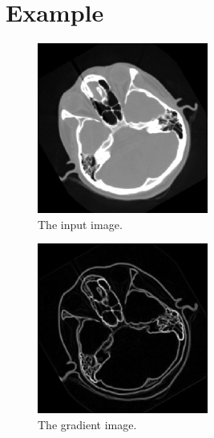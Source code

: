 \documentclass[IJ]{cesj}
\begin{document}
\section{Example}
\begin{figure}[b]
\centering
\includegraphics[width=0.5\textwidth]{cthead1.eps}
\caption{The input image.}
\end{figure}

\begin{figure}
\centering
\includegraphics[width=0.5\textwidth]{gradient.eps}
\caption{The gradient image.}
\end{figure}
\end{document}
